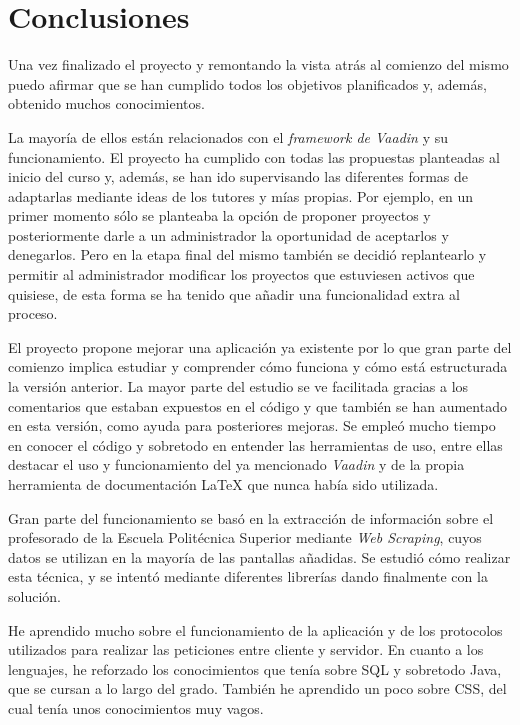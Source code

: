 
\section{Conclusiones}

Una vez finalizado el proyecto y remontando la vista atrás al comienzo del mismo puedo afirmar que se han cumplido todos los objetivos planificados y, además, obtenido muchos conocimientos.

La mayoría de ellos están relacionados con el \emph{framework de Vaadin} y su funcionamiento.
El proyecto ha cumplido con todas las propuestas planteadas al inicio del curso y, además, se han ido supervisando las diferentes formas de adaptarlas mediante ideas de los tutores y mías propias. 
Por ejemplo, en un primer momento sólo se planteaba la opción de proponer proyectos y posteriormente darle a un administrador la oportunidad de aceptarlos y denegarlos. Pero en la etapa final del mismo también se decidió replantearlo y permitir al administrador modificar los proyectos que estuviesen activos que quisiese, de esta forma se ha tenido que añadir una funcionalidad extra al proceso.

El proyecto propone mejorar una aplicación ya existente por lo que gran parte del comienzo implica estudiar y comprender cómo funciona y cómo está estructurada la versión anterior. La mayor parte del estudio se ve facilitada gracias a los comentarios que estaban expuestos en el código y que también se han aumentado en esta versión, como ayuda para posteriores mejoras.
Se empleó mucho tiempo en conocer el código y sobretodo en entender las herramientas de uso, entre ellas destacar el uso y funcionamiento del ya mencionado \emph{Vaadin} y de la propia herramienta de documentación \LaTeX{} que nunca había sido utilizada.

Gran parte del funcionamiento se basó en la extracción de información sobre el profesorado de la Escuela Politécnica Superior mediante \emph{Web Scraping}, cuyos datos se utilizan en la mayoría de las pantallas añadidas. Se estudió cómo realizar esta técnica, y se intentó mediante diferentes librerías dando finalmente con la solución.

He aprendido mucho sobre el funcionamiento de la aplicación y de los protocolos utilizados para realizar las peticiones entre cliente y servidor. En cuanto a los lenguajes, he reforzado los conocimientos que tenía sobre SQL y sobretodo Java, que se cursan a lo largo del grado. También he aprendido un poco sobre CSS, del cual tenía unos conocimientos muy vagos.

